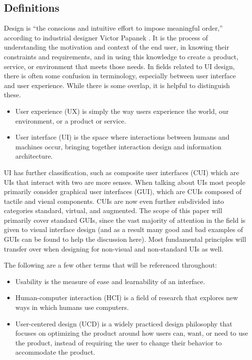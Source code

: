 \documentclass[12pt, oneside]{article}
\begin{document}
\subsection{Definitions}

Design is ``the conscious and intuitive effort to impose meaningful order,'' according to industrial designer Victor Papanek \cite[p.~12]{cooper_reimann_cronin_2014}. It is the process of understanding the motivation and context of the end user, in knowing their constraints and requirements, and in using this knowledge to create a product, service, or environment that meets those needs. In fields related to UI design, there is often some confusion in terminology, especially between user interface and user experience. While there is some overlap, it is helpful to distinguish these.

\begin{itemize}
\raggedright
    \item User experience (UX) is simply the way users experience the world, our environment, or a product or service.
    \item User interface (UI) is the space where interactions between humans and machines occur, bringing together interaction design and information architecture.
\end{itemize}

UI has further classification, such as composite user interfaces (CUI) which are UIs that interact with two are more senses. When talking about UIs most people primarily consider graphical user interfaces (GUI), which are CUIs composed of tactile and visual components. CUIs are now even further subdivided into categories standard, virtual, and augmented. The scope of this paper will primarily cover standard GUIs, since the vast majority of attention in the field is given to visual interface design (and as a result many good and bad examples of GUIs can be found to help the discussion here). Most fundamental principles will transfer over when designing for non-visual and non-standard UIs as well.

The following are a few other terms that will be referenced throughout:

\begin{itemize}
\raggedright
    \item Usability is the measure of ease and learnability of an interface.
    \item Human-computer interaction (HCI) is a field of research that explores new ways in which humans use computers.
    \item User-centered design (UCD) is a widely practiced design philosophy that focuses on optimizing the product around how users can, want, or need to use the product, instead of requiring the user to change their behavior to accommodate the product.
\end{itemize}
\end{document}

